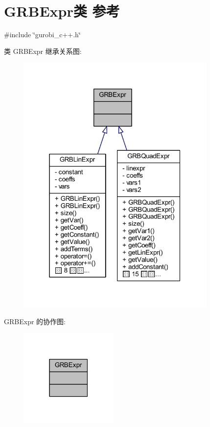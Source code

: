 \hypertarget{classGRBExpr}{}\section{G\+R\+B\+Expr类 参考}
\label{classGRBExpr}


{\ttfamily \#include \char`\"{}gurobi\+\_\+c++.\+h\char`\"{}}



类 G\+R\+B\+Expr 继承关系图\+:
\nopagebreak
\begin{figure}[H]
\begin{center}
\leavevmode
\includegraphics[width=280pt]{classGRBExpr__inherit__graph}
\end{center}
\end{figure}


G\+R\+B\+Expr 的协作图\+:
\nopagebreak
\begin{figure}[H]
\begin{center}
\leavevmode
\includegraphics[width=138pt]{classGRBExpr__coll__graph}
\end{center}
\end{figure}
